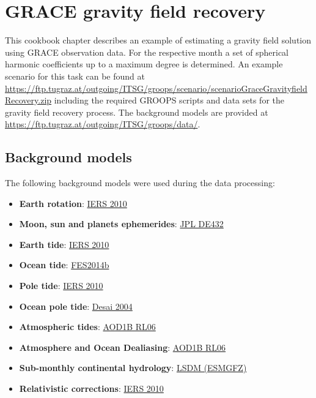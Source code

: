 \section{GRACE gravity field recovery}\label{cookbook.gravityFieldGrace}
This cookbook chapter describes an example of estimating a gravity field solution using GRACE observation
data. For the respective month a set of spherical harmonic coefficients up to a maximum degree is determined.
An example scenario for this task can be found at
\url{https://ftp.tugraz.at/outgoing/ITSG/groops/scenario/scenarioGraceGravityfieldRecovery.zip}
including the required GROOPS scripts and data sets for the gravity field recovery process.
The background models are provided at \url{https://ftp.tugraz.at/outgoing/ITSG/groops/data/}.


\subsection{Background models}\label{cookbook.gravityFieldGrace:backgroundModels}
The following background models were used during the data processing:
\begin{itemize}
  \item \textbf{Earth rotation}: \href{https://www.iers.org/IERS/EN/Publications/TechnicalNotes/tn36.html}{IERS 2010} %
  \item \textbf{Moon, sun and planets ephemerides}: \href{https://ipnpr.jpl.nasa.gov/progress_report/42-196/196C.pdf}{JPL DE432} %
  \item \textbf{Earth tide}: \href{https://www.iers.org/IERS/EN/Publications/TechnicalNotes/tn36.html}{IERS 2010} %
  \item \textbf{Ocean tide}: \href{https://www.aviso.altimetry.fr/es/data/products/auxiliary-products/global-tide-fes/description-fes2014.html}{FES2014b} %
  \item \textbf{Pole tide}: \href{https://www.iers.org/IERS/EN/Publications/TechnicalNotes/tn36.html}{IERS 2010} %
  \item \textbf{Ocean pole tide}: \href{https://doi.org/10.1029/2001JC001224}{Desai 2004} %
  \item \textbf{Atmospheric tides}: \href{https://doi.org/10.1093/gji/ggx302}{AOD1B RL06} %
  \item \textbf{Atmosphere and Ocean Dealiasing}: \href{https://doi.org/10.1093/gji/ggx302}{AOD1B RL06} %
  \item \textbf{Sub-monthly continental hydrology}: \href{https://doi.org/10.2312/GFZ.b103-08095}{LSDM (ESMGFZ)} %
  \item \textbf{Relativistic corrections}: \href{https://www.iers.org/IERS/EN/Publications/TechnicalNotes/tn36.html}{IERS 2010} %
\end{itemize}
